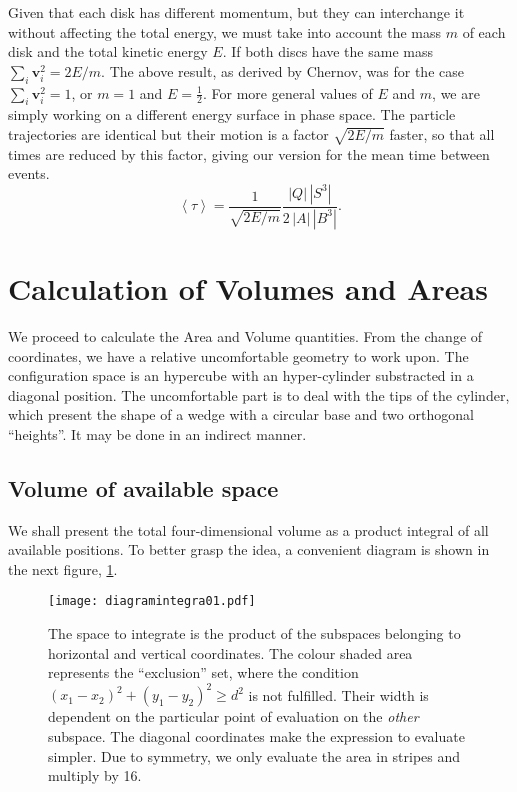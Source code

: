 \documentclass[letterpaper,10pt]{article}
\newcommand{\mean}[1]{\left \langle #1 \right \rangle}
\newcommand{\vv}{\mathbf{v}}
\begin{document}
Given that each disk has different momentum, but
they can interchange it without affecting the
total energy, we must take into account the mass $m$ of each disk and the total kinetic energy $E$.
If both discs have the same mass $\sum_i \vv_i^2 = 2E / m$.
The above result, as derived by Chernov, was for the case $\sum_i \vv_i^2 = 1$, or $m=1$ and $E=\frac{1}{2}$.  
For more general values of $E$ and $m$, we are simply working on a different energy surface in phase space. 
The particle trajectories are identical but their motion is a factor
$\sqrt{2E/m}$ faster, so that all times are reduced by this factor, giving our version for
the mean time between events.
\begin{equation}
  \mean{\tau} = \frac{1}{\sqrt{2E / m}} 
\frac{|Q| \, |S^3|} {2 \, |A| \, |B^3|}.	
\end{equation}



\section{Calculation of Volumes and Areas}

We proceed to calculate the Area and Volume quantities. From the change of coordinates,
we have a relative uncomfortable geometry to work upon. The configuration
space is an hypercube with an hyper-cylinder substracted in a diagonal position.
The uncomfortable part is to deal with the tips of the cylinder, which
present the  shape of a wedge with a circular base and two 
orthogonal ``heights''. It may be done in an indirect manner.


\subsection{Volume of available space}


We shall present the total four-dimensional volume as a product integral
of all available positions. To better grasp the idea, a convenient
diagram is shown in the next figure, \ref{diagintegra01}.

\begin{figure}[h]
  \centering
  \texttt{[image: diagramintegra01.pdf]}
  \caption{The space to integrate is the product of the subspaces
    belonging to horizontal and vertical coordinates. The colour
    shaded area represents the ``exclusion'' set, where the condition 
    $ (x_1-x_2)^2 + (y_1-y_2)^2 \ge d^2 $ is not fulfilled. 
    Their width is dependent on the particular point of evaluation
    on the \emph{other} subspace. The diagonal coordinates
    make the expression to evaluate simpler. Due to 
    symmetry, we only evaluate the area in stripes and
    multiply by 16.}\label{diagintegra01}
\end{figure}
\end{document}
